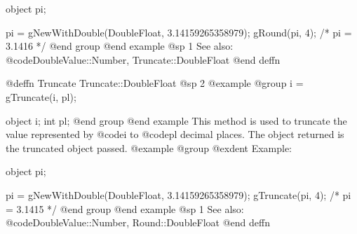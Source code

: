 object  pi;

pi = gNewWithDouble(DoubleFloat, 3.14159265358979);
gRound(pi, 4);     /*  pi = 3.1416  */
@end group
@end example
@sp 1
See also:  @code{DoubleValue::Number, Truncate::DoubleFloat}
@end deffn







 
@deffn {Truncate} Truncate::DoubleFloat
@sp 2
@example
@group
i = gTruncate(i, pl);

object  i;
int     pl;
@end group
@end example
This method is used to truncate the value represented by @code{i} to
@code{pl} decimal places.  The object returned is the truncated
object passed.
@example
@group
@exdent Example:

object  pi;

pi = gNewWithDouble(DoubleFloat, 3.14159265358979);
gTruncate(pi, 4);     /*  pi = 3.1415  */
@end group
@end example
@sp 1
See also:  @code{DoubleValue::Number, Round::DoubleFloat}
@end deffn













